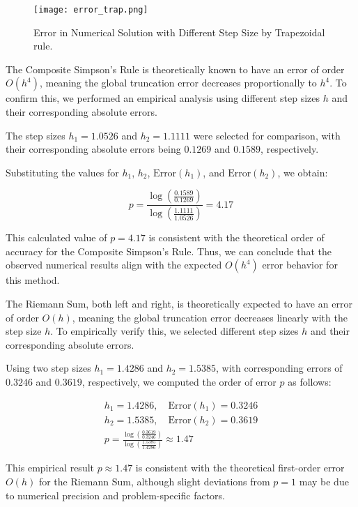 \documentclass[twocolumn, 11pt]{article}
\begin{document}
\begin{figure}[h!]
\centering
\texttt{[image: error\_trap.png]}
\caption{Error in Numerical Solution with Different Step Size by Trapezoidal rule.}
\label{fig:error_trap}
\end{figure}


The Composite Simpson's Rule is theoretically known to have an error of order \(O(h^4)\), meaning the global truncation error decreases proportionally to \(h^4\). To confirm this, we performed an empirical analysis using different step sizes \(h\) and their corresponding absolute errors.

The step sizes \(h_1 = 1.0526\) and \(h_2 = 1.1111\) were selected for comparison, with their corresponding absolute errors being \(0.1269\) and \(0.1589\), respectively.

Substituting the values for \(h_1\), \(h_2\), \(\text{Error}(h_1)\), and \(\text{Error}(h_2)\), we obtain:

\[
p = \frac{\log\left( \frac{0.1589}{0.1269} \right)}{\log\left( \frac{1.1111}{1.0526} \right)} = 4.17
\]

This calculated value of \(p = 4.17\) is consistent with the theoretical order of accuracy for the Composite Simpson's Rule. Thus, we can conclude that the observed numerical results align with the expected \(O(h^4)\) error behavior for this method.


The Riemann Sum, both left and right, is theoretically expected to have an error of order \(O(h)\), meaning the global truncation error decreases linearly with the step size \(h\). To empirically verify this, we selected different step sizes \(h\) and their corresponding absolute errors.


Using two step sizes \(h_1 = 1.4286\) and \(h_2 = 1.5385\), with corresponding errors of \(0.3246\) and \(0.3619\), respectively, we computed the order of error \(p\) as follows:

\begin{gather*}
    h_1 = 1.4286,\quad \text{Error}(h_1) = 0.3246 \\
    h_2 = 1.5385,\quad \text{Error}(h_2) = 0.3619 \\
    p = \frac{\log\left( \frac{0.3619}{0.3246} \right)}{\log\left( \frac{1.5385}{1.4286} \right)} \approx 1.47
\end{gather*}

This empirical result \(p \approx 1.47\) is consistent with the theoretical first-order error \(O(h)\) for the Riemann Sum, although slight deviations from \(p = 1\) may be due to numerical precision and problem-specific factors.
\end{document}

